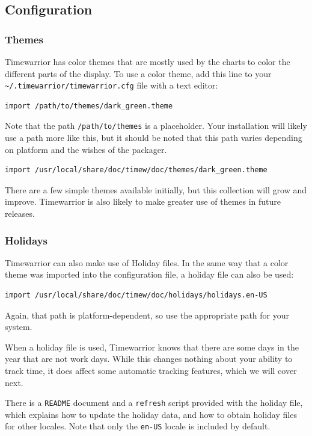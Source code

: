 \documentclass[t,handout]{beamer}
\begin{document}
\subsection{Configuration}

\begin{frame}[fragile]\frametitle{Themes}
    \vfill
    Timewarrior has color themes that are mostly used by the charts to color the different parts of the display. To use a color theme, add this line to your \verb=~/.timewarrior/timewarrior.cfg= file with a text editor:

    \begin{lstlisting}
import /path/to/themes/dark_green.theme\end{lstlisting}

    Note that the path \verb=/path/to/themes= is a placeholder. Your installation will likely use a path more like this, but it should be noted that this path varies depending on platform and the wishes of the packager.

    \begin{lstlisting}
import /usr/local/share/doc/timew/doc/themes/dark_green.theme\end{lstlisting}

    There are a few simple themes available initially, but this collection will grow and improve. Timewarrior is also likely to make greater use of themes in future releases.
\end{frame}

\begin{frame}[fragile]\frametitle{Holidays}
    \vfill
    Timewarrior can also make use of Holiday files. In the same way that a color theme was imported into the configuration file, a holiday file can also be used:

    \begin{lstlisting}
import /usr/local/share/doc/timew/doc/holidays/holidays.en-US\end{lstlisting}

    Again, that path is platform-dependent, so use the appropriate path for your system.

    When a holiday file is used, Timewarrior knows that there are some days in the year that are not work days. While this changes nothing about your ability to track time, it does affect some automatic tracking features, which we will cover next.

    There is a \verb=README= document and a \verb=refresh= script provided with the holiday file, which explains how to update the holiday data, and how to obtain holiday files for other locales. Note that only the \verb=en-US= locale is included by default.
\end{frame}
\end{document}

